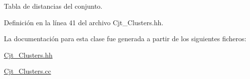 Tabla de distancias del conjunto. 



Definición en la línea 41 del archivo Cjt\+\_\+\+Clusters.\+hh.



La documentación para esta clase fue generada a partir de los siguientes ficheros\+:\begin{DoxyCompactItemize}
\item 
\hyperlink{_cjt___clusters_8hh}{Cjt\+\_\+\+Clusters.\+hh}\item 
\hyperlink{_cjt___clusters_8cc}{Cjt\+\_\+\+Clusters.\+cc}\end{DoxyCompactItemize}
